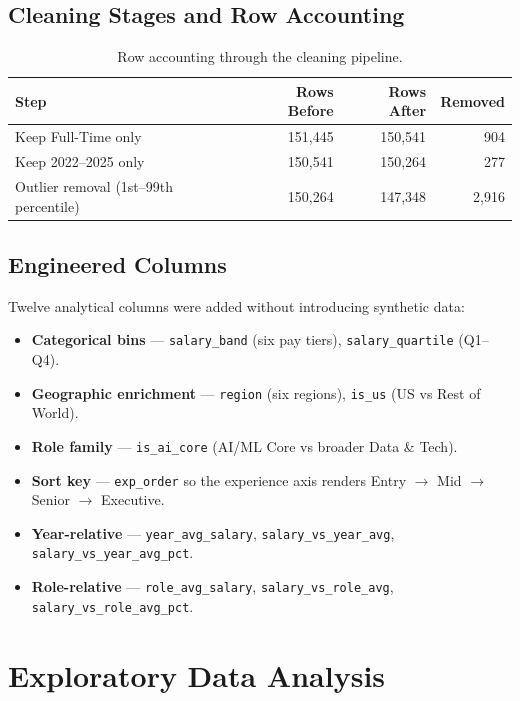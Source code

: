 \documentclass[11pt,a4paper,oneside]{report}
\begin{document}
\section{Cleaning Stages and Row Accounting}
\begin{table}[H]
    \centering
    \begin{tabular}{lrrr}
        \toprule
        \textbf{Step} & \textbf{Rows Before} & \textbf{Rows After} & \textbf{Removed} \\
        \midrule
        Keep Full-Time only & 151,445 & 150,541 & 904 \\
        Keep 2022--2025 only & 150,541 & 150,264 & 277 \\
        Outlier removal (1st--99th percentile) & 150,264 & 147,348 & 2,916 \\
        \bottomrule
    \end{tabular}
    \caption{Row accounting through the cleaning pipeline.}
\end{table}

\section{Engineered Columns}
Twelve analytical columns were added without introducing synthetic data:
\begin{itemize}[leftmargin=*]
    \item \textbf{Categorical bins} — \texttt{salary\_band} (six pay tiers), \texttt{salary\_quartile} (Q1--Q4).
    \item \textbf{Geographic enrichment} — \texttt{region} (six regions), \texttt{is\_us} (US vs Rest of World).
    \item \textbf{Role family} — \texttt{is\_ai\_core} (AI/ML Core vs broader Data \& Tech).
    \item \textbf{Sort key} — \texttt{exp\_order} so the experience axis renders Entry $\to$ Mid $\to$ Senior $\to$ Executive.
    \item \textbf{Year-relative} — \texttt{year\_avg\_salary}, \texttt{salary\_vs\_year\_avg}, \texttt{salary\_vs\_year\_avg\_pct}.
    \item \textbf{Role-relative} — \texttt{role\_avg\_salary}, \texttt{salary\_vs\_role\_avg}, \texttt{salary\_vs\_role\_avg\_pct}.
\end{itemize}

\chapter{Exploratory Data Analysis}
\end{document}
